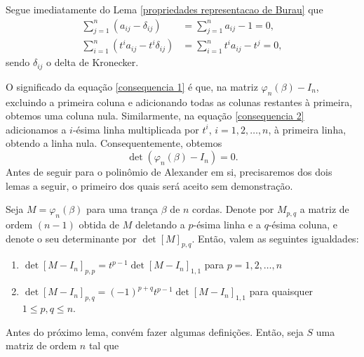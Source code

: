 	Segue imediatamente do Lema \ref{propriedades representacao de Burau} que
	\begin{align}
	\label{consequencia 1}
	    \sum_{j=1}^{n}(a_{ij} - \delta_{ij}) &= \sum_{j=1}^{n}a_{ij} - 1 = 0, \\ 
	\label{consequencia 2}
	    \sum_{i=1}^{n}(t^ia_{ij} - t^i\delta_{ij}) &= \sum_{i=1}^{n}t^ia_{ij} - t^j = 0,
	\end{align}
	sendo $\delta_{ij}$ o delta de Kronecker.
	
	\par\vspace{0.3cm} O significado da equação \eqref{consequencia 1} é que, 
	na matriz $\varphi_n(\beta) - I_n$, excluindo a primeira coluna e adicionando todas 
	as colunas restantes à primeira, obtemos uma coluna nula. Similarmente, na 
	equação \eqref{consequencia 2} adicionamos a $i$-ésima linha multiplicada por 
	$t^i$, $i=1,2,\dots,n$, à primeira linha, obtendo a linha nula. Consequentemente, obtemos
	\begin{equation*}
	    \det(\varphi_n(\beta) - I_n) = 0.
	\end{equation*}
	Antes de seguir para o polinômio de Alexander em si, precisaremos dos dois lemas a seguir,
	o primeiro dos quais será aceito sem demonstração.
	\begin{lemma}
	\label{exercicio}
		Seja $M = \varphi_n(\beta)$ para uma trança $\beta$ de $n$ cordas. 
		Denote por $M_{p,q}$ a matriz de ordem $(n-1)$ obtida de $M$ deletando a $p$-ésima 
		linha e a $q$-ésima coluna, e denote o seu determinante por $\det[M]_{p,q}$. 
		Então, valem as seguintes igualdades:
		\begin{enumerate}
			\item $\det[M - I_n]_{p,p} = t^{p-1}\det[M - I_n]_{1,1}$ para $p=1,2,\dots,n$
			\item $\det[M - I_n]_{p,q} = (-1)^{p+q}t^{p-1}\det[M - I_n]_{1,1}$ para quaisquer $1\leq p,q\leq n$.
		\end{enumerate}
	\end{lemma}
	Antes do próximo lema, convém fazer algumas definições. Então, seja $S$ uma matriz de ordem $n$ tal que
